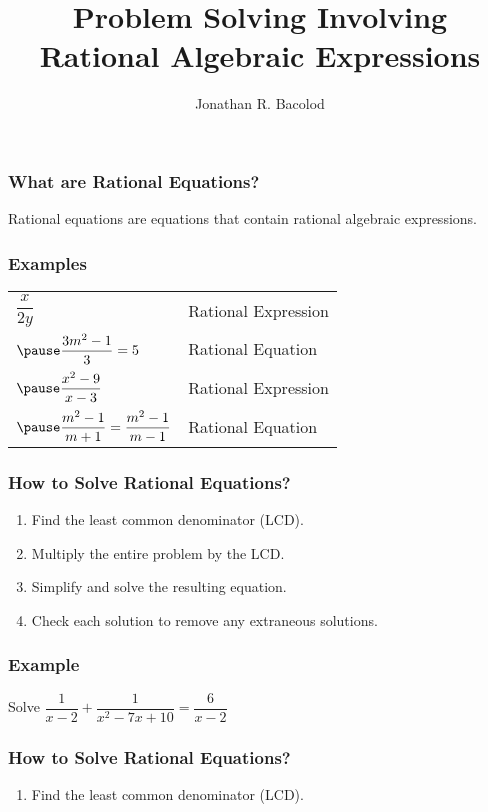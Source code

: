 \documentclass[14pt]{beamer}
\title[] {Problem Solving Involving Rational Algebraic Expressions}
\author{Jonathan R. Bacolod}
\institute[SHS]{Sauyo High School}
\date{}
\begin{document}
	\frame{\titlepage}
	
	\begin{frame}
		\frametitle{What are Rational Equations?}
		Rational equations are equations that contain rational algebraic expressions.
	\end{frame}

    \begin{frame}
    	\frametitle{Examples}
    	\begin{tabular}{ll}
    		$ \dfrac{x}{2y} $ & \pause Rational Expression \\[1em]
    		$ \pause \dfrac{3m^2 - 1}{3} = 5 $ & \pause Rational Equation\\[1em]
    		$ \pause \dfrac{x^2 - 9}{x - 3} $ & \pause Rational Expression \\[1em]
    		$ \pause \dfrac{m^2 - 1}{m + 1} = \dfrac{m^2 - 1}{m - 1} $ & \pause Rational Equation\\[1em]
    	\end{tabular}
    \end{frame}

    \begin{frame}
    	\frametitle{How to Solve Rational Equations?}
    	\begin{enumerate}
    		\item<1-> Find the least common denominator (LCD).
    		\item<2-> Multiply the entire problem by the LCD.
    		\item<3-> Simplify and solve the resulting equation.
    		\item<4-> Check each solution to remove any extraneous solutions.
       	\end{enumerate}
    \end{frame}

    \begin{frame}
    	\frametitle{Example}
    	Solve $ \dfrac{1}{x - 2} + \dfrac{1}{x^2 - 7x + 10} = \dfrac{6}{x - 2} $
    \end{frame}

    \begin{frame}
    	\frametitle{How to Solve Rational Equations?}
    	\begin{enumerate}
    		\item Find the least common denominator (LCD).
    	\end{enumerate}
    \end{frame}
\end{document}
